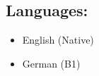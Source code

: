 \documentclass[9pt]{extarticle}
\begin{document}
\begin{minipage}{0.3\textwidth}
\begin{tcolorbox}[colback=grey]
		\subsection{Languages:}
		\begin{itemize}[leftmargin=*]
			\item English (Native)
			\item German (B1)
		\end{itemize}

	\end{tcolorbox}

\end{minipage}
\end{document}
